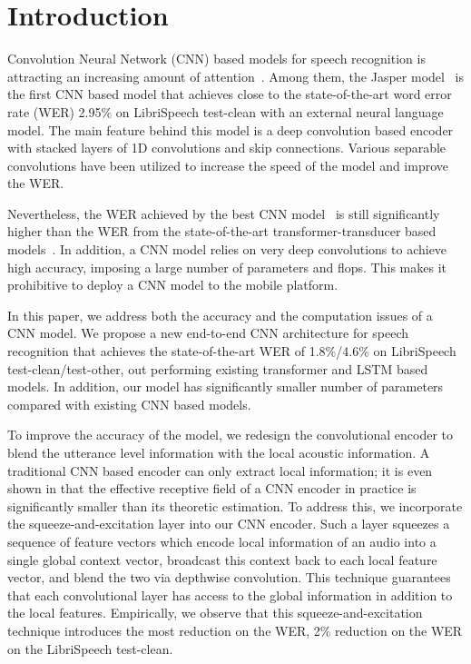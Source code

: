 \section{Introduction}

Convolution Neural Network (CNN) based models for speech recognition is attracting an increasing amount of attention~\cite{zhang2017very,zeghidour2018fully,li2019jasper,kriman2019quartznet}. Among them, the Jasper model~\cite{li2019jasper} is the first CNN based model that achieves close to the state-of-the-art word error rate (WER) 2.95\%  on LibriSpeech test-clean \cite{panayotov2015librispeech} with an external neural language model. The main feature behind this model is a deep convolution based encoder with stacked layers of 1D convolutions and skip connections. Various separable convolutions have been utilized to increase the speed of the model\cite{hannun2019sequence,kriman2019quartznet} and improve the WER.

Nevertheless, the WER achieved by the best CNN model~\cite{kriman2019quartznet} is still significantly higher than the WER from the state-of-the-art transformer-transducer based models~\cite{wang2019transformer}. In addition, a CNN model relies on very deep convolutions to achieve high accuracy, imposing a large number of parameters and flops. This makes it prohibitive to deploy a CNN model to the mobile platform. 

In this paper, we address both the accuracy and the computation issues of a CNN model. We propose a new end-to-end CNN architecture for speech recognition that achieves the state-of-the-art WER of 1.8\%/4.6\% on LibriSpeech test-clean/test-other, out performing existing transformer and LSTM based models\cite{zhang2020transformer, wang2019transformer, zeyer2019comparison, karita2019comparative, park2019specaugment}. In addition, our model has significantly smaller number of parameters compared with existing CNN based models\cite{li2019jasper, kriman2019quartznet}.

To improve the accuracy of the model, we redesign the convolutional encoder to blend the utterance level information with the local acoustic information. A traditional CNN based encoder can only extract local information; it is even shown in \cite{luo2016understanding} that the effective receptive field of a CNN encoder in practice is significantly smaller than its theoretic estimation. To address this, we incorporate the squeeze-and-excitation layer \cite{hu2018squeeze} into our CNN encoder. Such a layer squeezes a sequence of feature vectors which encode local information of an audio into a single global context vector, broadcast this context back to each local feature vector, and blend the two via depthwise convolution. This technique guarantees that each convolutional layer has access to the global information in addition to the local features. Empirically, we observe that this squeeze-and-excitation technique introduces the most reduction on the WER, 2\%  reduction on the WER on the LibriSpeech test-clean.

